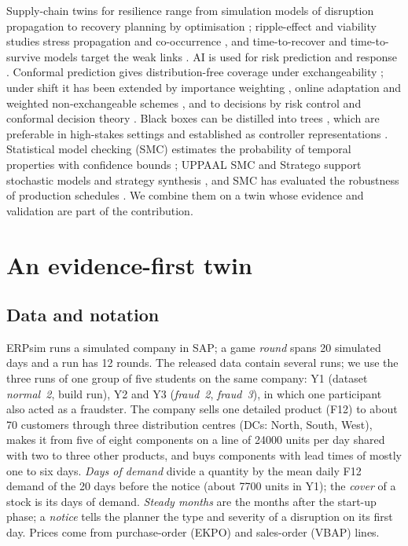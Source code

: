 \documentclass{ifacconf}
\begin{document}
Supply-chain twins for resilience range from simulation models of disruption propagation to recovery planning
by optimisation \citep{ivanov2021digitaltwin,hosseini2019resilience}; ripple-effect and viability studies stress
propagation and co-occurrence \citep{dolgui2018ripple,ivanov2023idt}, and time-to-recover and time-to-survive
models target the weak links \citep{simchilevi2015risk}. AI is used for risk prediction and response
\citep{baryannis2019scrm}. Conformal
prediction gives distribution-free coverage under exchangeability \citep{vovk2005alrw,romano2019cqr,
angelopoulos2023gentle}; under shift it has been extended by importance weighting
\citep{tibshirani2019covariateshift}, online adaptation \citep{gibbs2021aci} and weighted non-exchangeable
schemes \citep{barber2023beyond}, and to decisions by risk control and conformal decision theory
\citep{angelopoulos2024crc,lekeufack2024cdt}. Black boxes can be distilled into trees
\citep{bastani2017extraction}, which are preferable in high-stakes settings \citep{rudin2019stop} and established
as controller representations \citep{ashok2020dtcontrol}. Statistical model checking (SMC) estimates the
probability of temporal properties with confidence bounds \citep{legay2010smc}; UPPAAL SMC and Stratego support
stochastic models and strategy synthesis \citep{david2015uppaalsmc,david2015stratego}, and SMC has evaluated the
robustness of production schedules \citep{himmiche2018smc}. We combine them on a twin whose evidence and validation are part of the contribution.

\section{An evidence-first twin}

\subsection{Data and notation}
ERPsim runs a simulated company in SAP; a game \emph{round} spans 20 simulated days and a run has 12 rounds. The
released data \citep{tritscher2022openerp} contain several runs; we use the three runs of one group of five
students on the same company: Y1 (dataset \emph{normal~2}, build run), Y2 and Y3 (\emph{fraud~2},
\emph{fraud~3}), in which one participant also acted as a fraudster. The company sells one detailed product (F12)
to about 70 customers through three distribution centres (DCs: North, South, West), makes it from five of eight
components on a line of \num{24000} units per day shared with two to three other products, and buys components
with lead times of mostly one to six days. \emph{Days of demand} divide a quantity by the mean daily F12 demand of
the 20 days before the notice (about \num{7700} units in Y1); the \emph{cover} of a stock is its days of demand.
\emph{Steady months} are the months after the start-up phase; a \emph{notice} tells the planner the type and
severity of a disruption on its first day. Prices come from purchase-order (EKPO) and sales-order (VBAP) lines.
\end{document}
